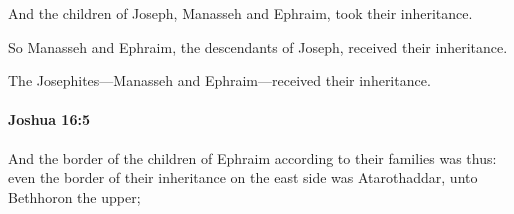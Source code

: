 			\begin{versebox}
					\item[BHS] 
					\item[ASV] And the children of Joseph, Manasseh and Ephraim, took their inheritance.
					\item[NIV] So Manasseh and Ephraim, the descendants of Joseph, received their inheritance.
					\item[NRSV] The Josephites—Manasseh and Ephraim—received their inheritance.
			\end{versebox}

		\paragraph{Joshua 16:5} %
			\label{JOSHUA-16-5}

			And the border of the children of Ephraim according to their families was thus: even the border of their inheritance on the east side was Atarothaddar, unto Bethhoron the upper;

